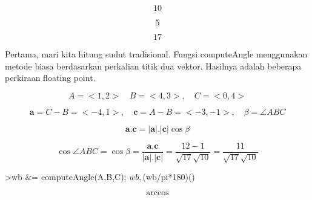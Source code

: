 \documentclass[a4paper,10pt]{article}
\begin{document}
\begin{eulernotebook}
\begin{eulercomment}
\begin{eulercomment}
\begin{eulercomment}
\begin{eulercomment}
\begin{eulercomment}
\begin{eulercomment}
\begin{eulercomment}
\begin{eulercomment}
\begin{eulercomment}
\begin{eulercomment}
\begin{eulercomment}
\begin{eulercomment}
\begin{eulercomment}
\begin{eulercomment}
\begin{eulercomment}
\begin{eulercomment}
\begin{eulercomment}
\begin{eulercomment}
\begin{eulercomment}
\begin{eulercomment}
\begin{eulercomment}
\begin{eulercomment}
\begin{eulercomment}
\begin{eulercomment}
\begin{eulercomment}
\begin{eulercomment}
\begin{eulercomment}
\begin{eulercomment}
\begin{eulercomment}
\begin{eulercomment}
\begin{eulercomment}
\begin{eulercomment}
\begin{eulercomment}
\begin{eulercomment}
\begin{eulercomment}
\begin{eulercomment}
\begin{eulercomment}
\begin{eulercomment}
\begin{eulercomment}
\begin{eulercomment}
\begin{eulercomment}
\begin{eulercomment}
\begin{eulercomment}
\begin{eulercomment}
\begin{eulercomment}
\begin{eulercomment}
\begin{eulercomment}
\begin{eulercomment}
\begin{eulercomment}
\begin{eulercomment}
\begin{eulercomment}
\begin{eulercomment}
\begin{eulercomment}
\begin{eulercomment}
\begin{eulercomment}
\begin{eulercomment}
\begin{eulercomment}
\begin{eulercomment}
\begin{eulercomment}
\begin{eulercomment}
\begin{eulercomment}
\begin{eulercomment}
\begin{eulerformula}
\[
10
\]
\end{eulerformula}
\begin{eulerformula}
\[
5
\]
\end{eulerformula}
\begin{eulerformula}
\[
17
\]
\end{eulerformula}
\begin{eulercomment}
Pertama, mari kita hitung sudut tradisional. Fungsi computeAngle
menggunakan metode biasa berdasarkan perkalian titik dua vektor.
Hasilnya adalah beberapa perkiraan floating point.

\end{eulercomment}
\begin{eulerformula}
\[
A=<1,2>\quad B=<4,3>,\quad C=<0,4>
\]
\end{eulerformula}
\begin{eulerformula}
\[
\mathbf{a}=C-B=<-4,1>,\quad \mathbf{c}=A-B=<-3,-1>,\quad \beta=\angle ABC
\]
\end{eulerformula}
\begin{eulerformula}
\[
\mathbf{a}.\mathbf{c}=|\mathbf{a}|.|\mathbf{c}|\cos \beta
\]
\end{eulerformula}
\begin{eulerformula}
\[
\cos \angle ABC =\cos\beta=\frac{\mathbf{a}.\mathbf{c}}{|\mathbf{a}|.|\mathbf{c}|}=\frac{12-1}{\sqrt{17}\sqrt{10}}=\frac{11}{\sqrt{17}\sqrt{10}}
\]
\end{eulerformula}
\begin{eulerprompt}
>wb &= computeAngle(A,B,C); $wb, $(wb/pi*180)()
\end{eulerprompt}
\begin{eulerformula}
\[
\arccos \]
\end{eulerformula}
\end{eulercomment}
\end{eulercomment}
\end{eulercomment}
\end{eulercomment}
\end{eulercomment}
\end{eulercomment}
\end{eulercomment}
\end{eulercomment}
\end{eulercomment}
\end{eulercomment}
\end{eulercomment}
\end{eulercomment}
\end{eulercomment}
\end{eulercomment}
\end{eulercomment}
\end{eulercomment}
\end{eulercomment}
\end{eulercomment}
\end{eulercomment}
\end{eulercomment}
\end{eulercomment}
\end{eulercomment}
\end{eulercomment}
\end{eulercomment}
\end{eulercomment}
\end{eulercomment}
\end{eulercomment}
\end{eulercomment}
\end{eulercomment}
\end{eulercomment}
\end{eulercomment}
\end{eulercomment}
\end{eulercomment}
\end{eulercomment}
\end{eulercomment}
\end{eulercomment}
\end{eulercomment}
\end{eulercomment}
\end{eulercomment}
\end{eulercomment}
\end{eulercomment}
\end{eulercomment}
\end{eulercomment}
\end{eulercomment}
\end{eulercomment}
\end{eulercomment}
\end{eulercomment}
\end{eulercomment}
\end{eulercomment}
\end{eulercomment}
\end{eulercomment}
\end{eulercomment}
\end{eulercomment}
\end{eulercomment}
\end{eulercomment}
\end{eulercomment}
\end{eulercomment}
\end{eulercomment}
\end{eulercomment}
\end{eulercomment}
\end{eulercomment}
\end{eulercomment}
\end{eulernotebook}
\end{document}
